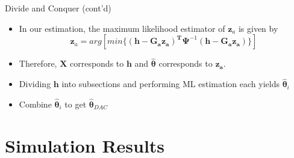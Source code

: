 \documentclass[10pt]{beamer}
\begin{document}
\begin{frame}{Divide and Conquer (cont'd)}
 \begin{itemize}
 \item In our estimation, the maximum likelihood estimator of $\mathbf{z}_a$ is given by
 $$ \mathbf{z}_a = arg[min\{\mathbf{(h-G_az_a)^T}\boldsymbol{\Psi}^{-1}\mathbf{(h-G_az_a)}\}] $$
 \item Therefore, $\mathbf{X}$ corresponds to $\mathbf{h}$ and $\hat{\boldsymbol{\theta}}$ corresponds to $\mathbf{z_a}$.
 \vfill
 \item Dividing $\mathbf{h}$ into subsections and performing ML estimation each yields $\hat{\boldsymbol{\theta}}_{i}$ 
 \vfill
 \item Combine $\hat{\boldsymbol{\theta}}_{i}$ to get $\hat{\boldsymbol{\theta}}_{DAC}$ 
 \end{itemize}
\end{frame}


\section{Simulation Results}
\end{document}
